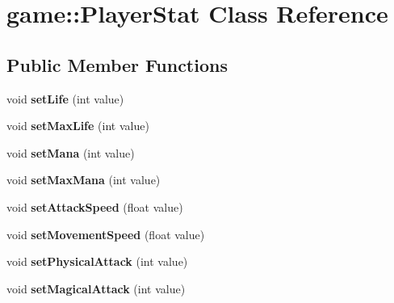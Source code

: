 \hypertarget{classgame_1_1_player_stat}{\section{game\-:\-:Player\-Stat Class Reference}
\label{classgame_1_1_player_stat}
}
\subsection*{Public Member Functions}
\begin{DoxyCompactItemize}
\item 
\hypertarget{classgame_1_1_player_stat_a068c60118e08a779ca25bf61a5d3bda8}{void {\bfseries set\-Life} (int value)}\label{classgame_1_1_player_stat_a068c60118e08a779ca25bf61a5d3bda8}

\item 
\hypertarget{classgame_1_1_player_stat_a3277ea20eb2bfd0ed65a43ab7c3a7c14}{void {\bfseries set\-Max\-Life} (int value)}\label{classgame_1_1_player_stat_a3277ea20eb2bfd0ed65a43ab7c3a7c14}

\item 
\hypertarget{classgame_1_1_player_stat_a7210298eb4650b482561d8729920f703}{void {\bfseries set\-Mana} (int value)}\label{classgame_1_1_player_stat_a7210298eb4650b482561d8729920f703}

\item 
\hypertarget{classgame_1_1_player_stat_a7fd2c598aa5be25d4cc29894097a0584}{void {\bfseries set\-Max\-Mana} (int value)}\label{classgame_1_1_player_stat_a7fd2c598aa5be25d4cc29894097a0584}

\item 
\hypertarget{classgame_1_1_player_stat_a00cab1af44c8133a6548aad3216dbc64}{void {\bfseries set\-Attack\-Speed} (float value)}\label{classgame_1_1_player_stat_a00cab1af44c8133a6548aad3216dbc64}

\item 
\hypertarget{classgame_1_1_player_stat_ab46ca33f9d6938ff96a1a9ddf4718477}{void {\bfseries set\-Movement\-Speed} (float value)}\label{classgame_1_1_player_stat_ab46ca33f9d6938ff96a1a9ddf4718477}

\item 
\hypertarget{classgame_1_1_player_stat_a44e03c967c8504b914911b06239c6b01}{void {\bfseries set\-Physical\-Attack} (int value)}\label{classgame_1_1_player_stat_a44e03c967c8504b914911b06239c6b01}

\item 
\hypertarget{classgame_1_1_player_stat_acb15b3d873f5c32fd110f6cbe4ce7594}{void {\bfseries set\-Magical\-Attack} (int value)}\label{classgame_1_1_player_stat_acb15b3d873f5c32fd110f6cbe4ce7594}


\end{DoxyCompactItemize}
